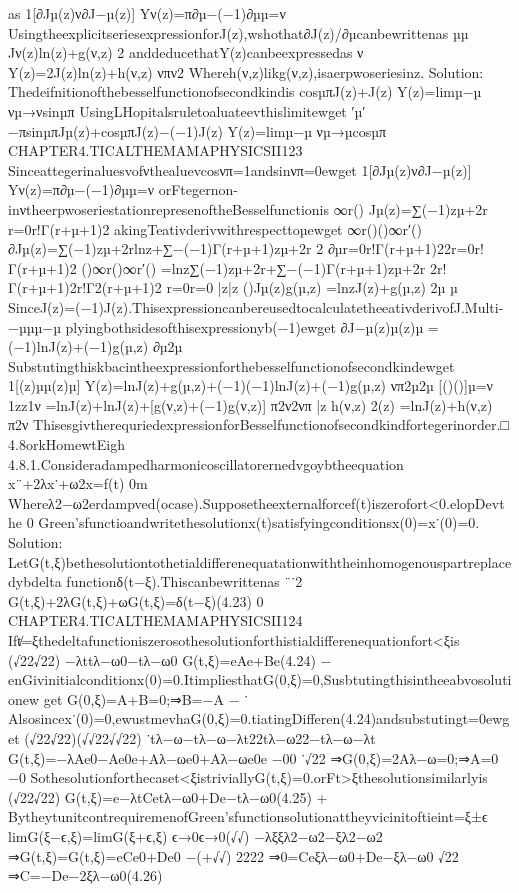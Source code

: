 {{{{{{as
1[∂Jµ(z)ν∂J−µ(z)]
Yν(z)=π∂µ−(−1)∂µµ=ν
UsingtheexplicitseriesexpressionforJ(z),wshothat∂J(z)/∂µcanbewrittenas
µµ
Jν(z)ln(z)+g(ν,z)
2
anddeducethatY(z)canbeexpressedas
ν
Y(z)=2J(z)ln(z)+h(ν,z)
νπν2
Whereh(ν,z)likg(ν,z),isaerpwoseriesinz.
Solution:
Thedeifnitionofthebesselfunctionofsecondkindis
cosµπJ(z)+J(z)
Y(z)=limµ−µ
νµ→νsinµπ
UsingLHopitalsruletoaluateevthislimitewget
′µ′
−πsinµπJµ(z)+cosµπJ(z)−(−1)J(z)
Y(z)=limµ−µ
νµ→µcosµπ
CHAPTER4.TICALTHEMAMAPHYSICSII123
Sinceattegerinaluesvofνthealuevcosνπ=1andsinνπ=0ewget
1[∂Jµ(z)ν∂J−µ(z)]
Yν(z)=π∂µ−(−1)∂µµ=ν
orFtegernon-inνtheerpwoseriestationrepresenoftheBesselfunctionis
∞r()
Jµ(z)=∑(−1)zµ+2r
r=0r!Γ(r+µ+1)2
akingTeativderivwithrespecttoµewget
∞r()()∞r′()
∂Jµ(z)=∑(−1)zµ+2rlnz+∑−(−1)Γ(r+µ+1)zµ+2r
2
∂µr=0r!Γ(r+µ+1)22r=0r!Γ(r+µ+1)2
()∞r()∞r′()
=lnz∑(−1)zµ+2r+∑−(−1)Γ(r+µ+1)zµ+2r
2r!Γ(r+µ+1)2r!Γ2(r+µ+1)2
r=0r=0
|{z}|{z}
()Jµ(z)g(µ,z)
=lnzJ(z)+g(µ,z)
2µ
µ
SinceJ(z)=(−1)J(z).ThisexpressioncanbereusedtocalculatetheeativderivofJ.Multi-
−µµµ−µ
plyingbothsidesofthisexpressionyb(−1)ewget
∂J−µ(z)µ(z)µ
=(−1)lnJ(z)+(−1)g(µ,z)
∂µ2µ
Substutingthiskbacintheexpressionforthebesselfunctionofsecondkindewget
1[(z)µµ(z)µ]
Y(z)=lnJ(z)+g(µ,z)+(−1)(−1)lnJ(z)+(−1)g(µ,z)
νπ2µ2µ
[()()]µ=ν
1zz1ν
=lnJ(z)+lnJ(z)+[g(ν,z)+(−1)g(ν,z)]
π2ν2νπ
|{z}
h(ν,z)
2(z)
=lnJ(z)+h(ν,z)
π2ν
ThisesgivtherequriedexpressionforBesselfunctionofsecondkindfortegerinorder.□
4.8orkHomewtEigh
4.8.1.Consideradampedharmonicoscillatorernedvgoybtheequation
x¨+2λx˙+ω2x=f(t)
0m
Whereλ2−ω2erdampved(ocase).Supposetheexternalforcef(t)iszerofort<0.elopDevthe
0
Green’sfunctioandwritethesolutionx(t)satisfyingconditionsx(0)=x˙(0)=0.
Solution:
LetG(t,ξ)bethesolutiontothetialdifferenequatationwiththeinhomogenouspartreplacedybdelta
functionδ(t−ξ).Thiscanbewrittenas
¨˙2
G(t,ξ)+2λG(t,ξ)+ωG(t,ξ)=δ(t−ξ)(4.23)
0
CHAPTER4.TICALTHEMAMAPHYSICSII124
Ift̸=ξthedeltafunctioniszerosothesolutionforthistialdifferenequationfort<ξis
(√22√22)
−λttλ−ω0−tλ−ω0
G(t,ξ)=eAe+Be(4.24)
−
enGivinitialconditionx(0)=0.ItimpliesthatG(0,ξ)=0,Susbtutingthisintheeabvosolutionew
get
G(0,ξ)=A+B=0;⇒B=−A
−
˙
Alsosincex˙(0)=0,ewustmevhaG(0,ξ)=0.tiatingDifferen(4.24)andsubstutingt=0ewget
(√22√22)(√√22√√22)
˙tλ−ω−tλ−ω−λt22tλ−ω22−tλ−ω−λt
G(t,ξ)=−λAe0−Ae0e+Aλ−ωe0+Aλ−ωe0e
−00
˙√22
⇒G(0,ξ)=2Aλ−ω=0;⇒A=0
−0
Sothesolutionforthecaset<ξistriviallyG(t,ξ)=0.orFt>ξthesolutionsimilarlyis
(√22√22)
G(t,ξ)=e−λtCetλ−ω0+De−tλ−ω0(4.25)
+
BytheytunitcontrequiremenofGreen’sfunctionsolutionattheyvicinitoftieint=ξ±ϵ
limG(ξ−ϵ,ξ)=limG(ξ+ϵ,ξ)
ϵ→0ϵ→0(√√)
−λξξλ2−ω2−ξλ2−ω2
⇒G(t,ξ)=G(t,ξ)=eCe0+De0
−(+√√)
2222
⇒0=Ceξλ−ω0+De−ξλ−ω0
√22
⇒C=−De−2ξλ−ω0(4.26)
}}}}}}
